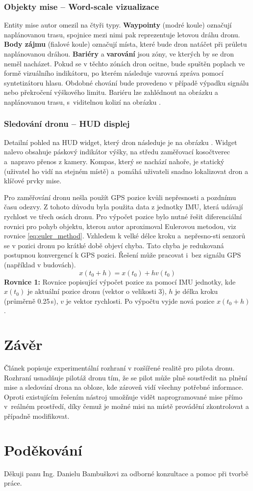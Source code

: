 \documentclass[czech]{ExcelAtFIT} %
\begin{document}
\subsubsection*{Objekty mise -- Word-scale vizualizace}
Entity mise autor omezil na čtyři typy. \textbf{Waypointy} (modré koule) označují naplánovanou trasu, spojnice mezi nimi pak reprezentuje letovou dráhu dronu. \textbf{Body zájmu} (fialové koule) označují místa, které bude dron natáčet při průletu naplánovanou dráhou. \textbf{Bariéry} a \textbf{varování} jsou zóny, ve kterých by se dron neměl nacházet. Pokud se v těchto zónách dron ocitne, bude spuštěn poplach ve formě vizuálního indikátoru, po kterém následuje varovná zpráva pomocí syntetizátoru  hlasu. Obdobné chování bude provedeno v případě výpadku signálu nebo překročení výškového limitu. Bariéru lze zahlédnout na obrázku  a naplánovanou trasu, s~viditelnou kolizí na obrázku .

\subsubsection*{Sledování dronu -- HUD displej}
Detailní pohled na HUD widget, který dron následuje je na obrázku . Widget nalevo obsahuje  páskový indikátor výšky, na středu zaměřovací kosočtverec a~napravo přenos z kamery. Kompas, který se nachází nahoře, je statický (uživatel ho vidí na stejném místě) a~pomáhá uživateli snadno lokalizovat dron a klíčové prvky mise.

Pro zaměřování dronu nešla použít GPS pozice kvůli nepřesnosti a pozdnímu času odezvy. Z tohoto důvodu byla použita data z jednotky IMU, která udávají rychlost ve třech osách dronu. Pro výpočet pozice bylo nutné řešit  diferenciální rovnici pro pohyb objektu, kterou autor aproximoval Eulerovou metodou, viz rovnice \eqref{eq:euler_method}.  Vzhledem k velké délce kroku a~nepřesno-sti senzorů se v pozici dronu po krátké době objeví chyba. Tato chyba je redukovaná postupnou konvergencí k GPS pozici. Řešení může pracovat i~bez signálu GPS (například v budovách).
\begin{equation}
x(t_0+h)=x(t_0)+hv(t_0)
\label{eq:euler_method}
\end{equation}
\captionsetup{labelformat=empty}
\textbf{Rovnice 1:} Rovnice popisující výpočet pozice za pomocí IMU jednotky, kde $x(t_0)$ je aktuální pozice dronu (vektor o velikosti 3), $h$ je délka kroku (průměrně 0.25\,s), $v$ je vektor rychlosti. Po výpočtu vyjde nová pozice $x(t_0+h)$.

\section{Závěr}
Článek popisuje experimentální rozhraní v rozšířené realitě pro pilota dronu. Rozhraní usnadňuje pilotáž dronu tím, že se pilot může plně soustředit na plnění mise a sledování drona na obloze, kde zároveň vidí všechny potřebné informace.\,Oproti existujícím řešením nástroj umožňuje vidět naprogramované mise přímo v~reálném prostředí, díky čemuž je možné misi na místě provádění zkontrolovat a případně modifikovat.


\section*{Poděkování}
Děkuji panu Ing. Danielu Bambuškovi za odborné konzultace a pomoc při tvorbě práce.



\end{document}
